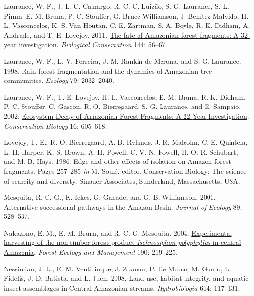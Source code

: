 \documentclass[
  12pt,
  man, donotrepeattitle,floatsintext]{apa6}
\newlength{\cslhangindent}
\newlength{\cslentryspacingunit} %
\newenvironment{CSLReferences}[2] %
 {%
  \setlength{\parindent}{0pt}
  \ifodd #1
  \let\oldpar\par
  \def\par{\hangindent=\cslhangindent\oldpar}
  \fi
  \setlength{\parskip}{#2\cslentryspacingunit}
 }%
 {}
\begin{document}
\begin{CSLReferences}{1}{0}
\leavevmode{}%
Laurance, W. F., J. L. C. Camargo, R. C. C. Luizão, S. G. Laurance, S. L. Pimm, E. M. Bruna, P. C. Stouffer, G. Bruce Williamson, J. Benítez-Malvido, H. L. Vasconcelos, K. S. Van Houtan, C. E. Zartman, S. A. Boyle, R. K. Didham, A. Andrade, and T. E. Lovejoy. 2011. \href{https://doi.org/10.1016/j.biocon.2010.09.021}{The fate of {Amazonian} forest fragments: {A} 32-year investigation}. \emph{Biological Conservation} 144: 56--67.

\leavevmode{}%
Laurance, W. F., L. V. Ferreira, J. M. Rankin de Merona, and S. G. Laurance. 1998. Rain forest fragmentation and the dynamics of {Amazonian} tree communities. \emph{Ecology} 79: 2032--2040.

\leavevmode{}%
Laurance, W. F., T. E. Lovejoy, H. L. Vasconcelos, E. M. Bruna, R. K. Didham, P. C. Stouffer, C. Gascon, R. O. Bierregaard, S. G. Laurance, and E. Sampaio. 2002. \href{https://doi.org/10.1046/j.1523-1739.2002.01025.x}{Ecosystem {Decay} of {Amazonian} {Forest} {Fragments}: A 22-{Year} {Investigation}}. \emph{Conservation Biology} 16: 605--618.

\leavevmode{}%
Lovejoy, T. E., R. O. Bierregaard, A. B. Rylands, J. R. Malcolm, C. E. Quintela, L. H. Harper, K. S. Brown, A. H. Powell, C. V. N. Powell, H. O. R. Schubart, and M. B. Hays. 1986. Edge and other effects of isolation on {Amazon} forest fragments. Pages 257--285 \emph{in} M. Soulé, editor. Conservation {Biology}: The science of scarcity and diversity. Sinauer Associates, Sunderland, Massachusetts, USA.

\leavevmode{}%
Mesquita, R. C. G., K. Ickes, G. Ganade, and G. B. Williamson. 2001. Alternative successional pathways in the {Amazon} {Basin}. \emph{Journal of Ecology} 89: 528--537.

\leavevmode{}%
Nakazono, E. M., E. M. Bruna, and R. C. G. Mesquita. 2004. \href{https://doi.org/10.1016/j.foreco.2003.10.013}{Experimental harvesting of the non-timber forest product \emph{{Ischnosiphon} polyphyllus} in central {Amazonia}}. \emph{Forest Ecology and Management} 190: 219--225.

\leavevmode{}%
Nessimian, J. L., E. M. Venticinque, J. Zuanon, P. De Marco, M. Gordo, L. Fidelis, J. D. Batista, and L. Juen. 2008. Land use, habitat integrity, and aquatic insect assemblages in {Central} {Amazonian} streams. \emph{Hydrobiologia} 614: 117--131.


\end{CSLReferences}
\end{document}
